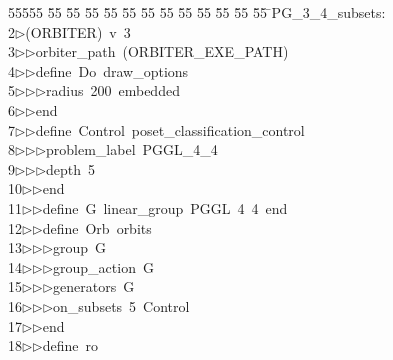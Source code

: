 %
%
\begin{tabbing}
55555 \= 55 \= 55 \= 55 \= 55 \= 55 \= 55 \= 55 \= 55 \= 55 \= 55 \= 55 \= 55 \= \>PG\_3\_4\_subsets:\\[0pt]
2\>$\triangleright$\>(ORBITER)\ v\ 3\ \\[0pt]
3\>$\triangleright$\>$\triangleright$\>orbiter\_path\ (ORBITER\_EXE\_PATH)\ \\[0pt]
4\>$\triangleright$\>$\triangleright$\>define\ Do\ draw\_options\ \\[0pt]
5\>$\triangleright$\>$\triangleright$\>$\triangleright$\>radius\ 200\ embedded\ \\[0pt]
6\>$\triangleright$\>$\triangleright$\>end\ \\[0pt]
7\>$\triangleright$\>$\triangleright$\>define\ Control\ poset\_classification\_control\ \\[0pt]
8\>$\triangleright$\>$\triangleright$\>$\triangleright$\>problem\_label\ PGGL\_4\_4\ \\[0pt]
9\>$\triangleright$\>$\triangleright$\>$\triangleright$\>depth\ 5\ \\[0pt]
10\>$\triangleright$\>$\triangleright$\>end\ \\[0pt]
11\>$\triangleright$\>$\triangleright$\>define\ G\ linear\_group\ PGGL\ 4\ 4\ end\ \\[0pt]
12\>$\triangleright$\>$\triangleright$\>define\ Orb\ orbits\ \\[0pt]
13\>$\triangleright$\>$\triangleright$\>$\triangleright$\>group\ G\ \\[0pt]
14\>$\triangleright$\>$\triangleright$\>$\triangleright$\>group\_action\ G\ \\[0pt]
15\>$\triangleright$\>$\triangleright$\>$\triangleright$\>generators\ G\ \\[0pt]
16\>$\triangleright$\>$\triangleright$\>$\triangleright$\>on\_subsets\ 5\ Control\ \\[0pt]
17\>$\triangleright$\>$\triangleright$\>end\ \\[0pt]
18\>$\triangleright$\>$\triangleright$\>define\ ro\ \\[0pt]

\end{tabbing}
